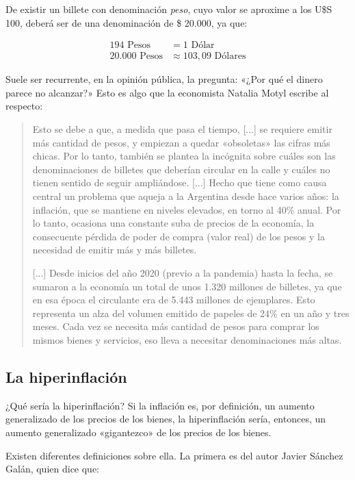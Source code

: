 \documentclass[12pt,a4paper,twoside]{book}
\begin{document}
De existir un billete con denominación \textit{peso}, cuyo valor se aproxime a los U\$S 100, deberá ser de una denominación de \$ 20.000, ya que:

\begin{align*}
194 \text{ Pesos} &= 1 \text{ Dólar}  \\
20.000 \text{ Pesos} & \approx 103,09 \text{ Dólares}
\end{align*}

Suele ser recurrente, en la opinión pública, la pregunta: «¿Por qué el dinero parece no alcanzar?» Esto es algo que la economista Natalia Motyl escribe al respecto:

\begin{quotation}
Esto se debe a que, a medida que pasa el tiempo, [...] se requiere emitir más cantidad de pesos, y empiezan a quedar «obsoletas» las cifras más chicas. Por lo tanto, también se plantea la incógnita sobre cuáles son las denominaciones de billetes que deberían circular en la calle y cuáles no tienen sentido de seguir ampliándose. [...] Hecho que tiene como causa central un problema que aqueja a la Argentina desde hace varios años: la inflación, que se mantiene en niveles elevados, en torno al 40\% anual. Por lo tanto, ocasiona una constante suba de precios de la economía, la consecuente pérdida de poder de compra (valor real) de los pesos y la necesidad de emitir más y más billetes.

[...] Desde inicios del año 2020 (previo a la pandemia) hasta la fecha, se sumaron a la economía un total de unos 1.320 millones de billetes, ya que en esa época el circulante era de 5.443 millones de ejemplares. Esto representa un alza del volumen emitido de papeles de 24\% en un año y tres meses. Cada vez se necesita más cantidad de pesos para comprar los mismos bienes y servicios, eso lleva a necesitar denominaciones más altas. \cite{motyl:pesos}
\end{quotation}

\subsection{La hiperinflación}
¿Qué sería la hiperinflación? Si la inflación es, por definición, un aumento generalizado de los precios de los bienes, la hiperinflación sería, entonces, un aumento generalizado «gigantezco» de los precios de los bienes.

Existen diferentes definiciones sobre ella. La primera es del autor Javier Sánchez Galán, quien dice que:
\end{document}
